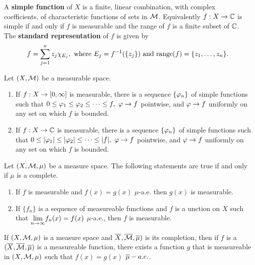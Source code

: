 \vs

\dfn A \textbf{simple function} of $X$ is a finite, linear combination, with complex coefficients, of characteristic functions of sets in $\mathcal{M}$. Equivalently $f:X\rightarrow \mathbb{C}$ is simple if and only if $f$ is measurable and the range of $f$ is a finite subset of $\mathbb{C}$. The \textbf{standard representation} of $f$ is given by
\[f = \sum_{j = 1}^n z_j \chi_{E_j}, \text{ where $E_j = f^{-1}(\{z_j\})$ and range$(f) = \{z_1,\ldots,z_n\}$.}\]

\vs

\begin{thm}
Let $(X, \mathcal{M})$ be a measurable space.
\begin{enumerate}[\hspace{1.4 em} a.]
    \item If $f:X\rightarrow [0,\infty]$ is measurable, there is a sequence $\{\varphi_n\}$ of simple functions such that $0 \leq \vphi_1\leq \vphi_2\leq \cdots\leq f,\ \vphi \ra f$ pointwise, and $\varphi\rightarrow f$ uniformly on any set on which $f$ is bounded.
    \item If $f:X\rightarrow \mathbb{C}$ is measurable, there is a sequence $\{\varphi_n\}$ of simple functions such that $0 \leq |\varphi_1|\leq |\varphi_2|\leq \cdots\leq |f|,\ \varphi \rightarrow f$ pointwise, and $\varphi\rightarrow f$ uniformly on any set on which $f$ is bounded.
\end{enumerate}
\end{thm}

\vs

\begin{prop}
Let $(X, \mathcal{M}, \mu)$ be a measure space. The following statements are true if and only if $\mu$ is a complete.
\begin{enumerate}
    \item If $f$ is measurable and $f(x) = g(x)$ $\mu$-a.e. then $g(x)$ is measurable.
    \item If $\{f_n\}$ is a sequence of measureable functions and $f$ is a unction on $X$ such that $\underset{n\rightarrow\infty}{\lim} f_n(x) = f(x)$ $\mu$-a.e., then $f$ is measurable.
\end{enumerate}
\end{prop}

\vs

\begin{prop}
If $(X, \mathcal{M}, \mu)$ is a measure space and $\overline X, \overline {\mathcal{M}}, \overline \mu)$ is its completion, then if $f$ is a $(\overline X, \overline {\mathcal{M}}, \overline\mu)$ is a measureable function, there exists a function $g$ that is measureable in $(X, \mathcal{M}, \mu)$ such that $f(x) = g(x)$ $\overline\mu-a.e.$.
\end{prop}

